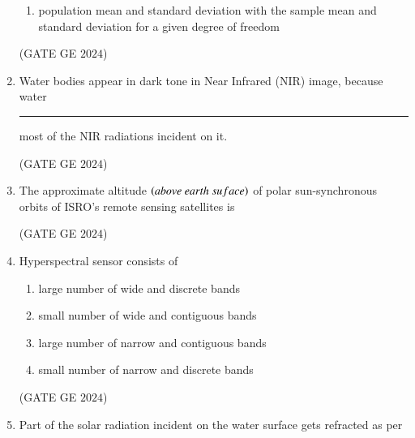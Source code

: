 \documentclass[journal,12pt,onecolumn]{IEEEtran}
\theoremstyle{remark}
\begin{document}
\begin{enumerate}
\begin{enumerate}
\item population mean and standard deviation with the sample mean 
and standard deviation for a given degree of freedom
\end{enumerate}
\hfill{(GATE GE $2024$)}
\bigskip
\item Water bodies appear in dark tone in Near Infrared (NIR) image, because water \rule{2cm}{0.5mm} most of the NIR radiations incident on it.
\begin{enumerate}
\end{enumerate}
\hfill{(GATE GE $2024$)}
\bigskip
\item The approximate altitude $\brak{above\ earth\ suface}$ of polar sun-synchronous orbits of ISRO's remote sensing satellites is
\begin{enumerate}
\end{enumerate}
\hfill{(GATE GE $2024$)}
\bigskip
\item Hyperspectral sensor consists of
\begin{enumerate}
\item large number of wide and discrete bands
\item small number of wide and contiguous bands
\item large number of narrow and contiguous bands
\item small number of narrow and discrete bands
\end{enumerate}
\hfill{(GATE GE $2024$)}
\bigskip
\item Part of the solar radiation incident on the water surface gets refracted as per
\begin{enumerate}
\end{enumerate}
\end{enumerate}
\end{document}
